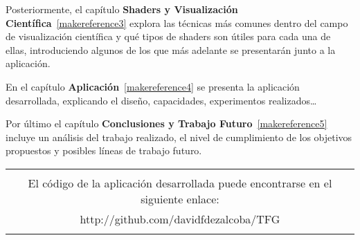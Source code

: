 Posteriormente, el capítulo \textbf{Shaders y Visualización
Científica}~\ref{makereference3} explora las técnicas más comunes dentro del
campo de visualización científica y qué tipos de shaders son útiles para cada
una de ellas, introduciendo algunos de los que más adelante se presentarán junto
a la aplicación.

En el capítulo \textbf{Aplicación}~\ref{makereference4} se presenta la
aplicación desarrollada, explicando el diseño, capacidades, experimentos
realizados\ldots

Por último el capítulo \textbf{Conclusiones y Trabajo
Futuro}~\ref{makereference5} incluye un análisis del trabajo realizado, el nivel
de cumplimiento de los objetivos propuestos y posibles líneas de trabajo
futuro.

\begin{table}[b]
		\begin{tabular}[b]{|c|}
			\hline
			\\
			El código de la aplicación desarrollada puede encontrarse en el
			siguiente enlace:\\
			http://github.com/davidfdezalcoba/TFG\\
			\\
			\hline
		\end{tabular}
\end{table}
